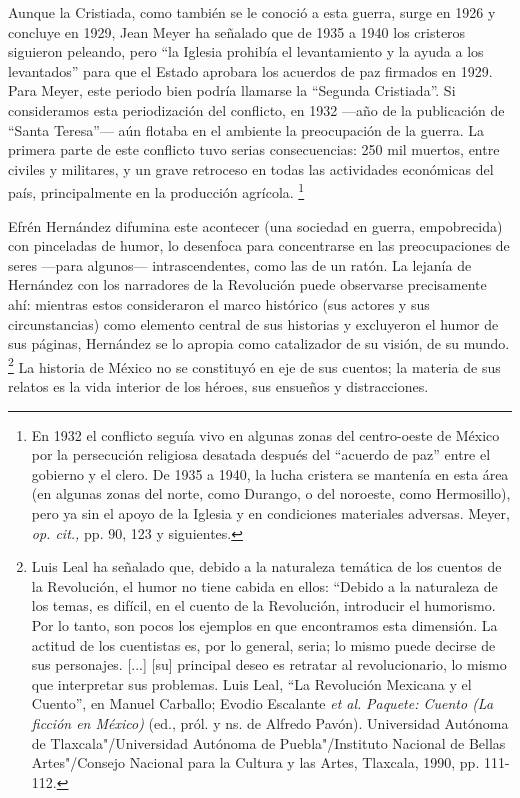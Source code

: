 \documentclass[14pt,twoside,final]{extbook} %
\let\oldfootnote\footnote
\renewcommand\footnote[1]{%
\oldfootnote{\hspace{1mm}#1}}
\begin{document}
Aunque la Cristiada, como también se le conoció a esta guerra, surge en 1926 y concluye en 1929, Jean Meyer ha señalado que de 1935 a 1940 los cristeros siguieron peleando, pero ``la Iglesia prohibía el levantamiento y la ayuda a los levantados'' para que el Estado aprobara los acuerdos de paz firmados en 1929. Para Meyer, este periodo bien podría llamarse la ``Segunda Cristiada''. Si consideramos esta
periodización del conflicto, en 1932 ---año de la publicación de ``Santa Teresa''--- aún flotaba en el ambiente la preocupación de la guerra. La primera parte de este conflicto tuvo serias consecuencias: 250 mil muertos, entre civiles y militares, y un grave retroceso en todas las actividades económicas del país, principalmente en la producción agrícola.\footnote{En 1932 el conflicto seguía vivo en algunas zonas del centro-oeste de México por la persecución religiosa desatada después del ``acuerdo de paz'' entre el gobierno y el clero. De 1935 a 1940, la lucha cristera se mantenía en esta área (en algunas zonas del norte, como Durango, o del noroeste, como Hermosillo), pero ya sin el apoyo de la Iglesia y en condiciones materiales adversas. Meyer, \emph{op. cit.,} pp. 90, 123 y siguientes.}

Efrén Hernández difumina este acontecer (una sociedad en guerra, empobrecida) con pinceladas de humor, lo desenfoca para concentrarse en las preocupaciones de seres ---para algunos--- intrascendentes, como las de un ratón. La lejanía de Hernández con los narradores de la Revolución puede observarse precisamente ahí: mientras estos consideraron el marco histórico (sus actores y sus circunstancias) como elemento central de sus historias y excluyeron el humor de sus páginas, Hernández se lo apropia como catalizador de su visión, de su mundo.\footnote{Luis Leal ha señalado que, debido a la naturaleza temática de los cuentos de la Revolución, el humor no tiene cabida en ellos: ``Debido a la naturaleza de los temas, es difícil, en el cuento de la Revolución, introducir el humorismo. Por lo tanto, son pocos los ejemplos en que encontramos esta dimensión. La actitud de los cuentistas es, por lo general, seria; lo mismo puede decirse de sus personajes. [...] [su] principal deseo es retratar al revolucionario, lo mismo que interpretar sus problemas. Luis Leal, ``La Revolución Mexicana y el Cuento'', en Manuel Carballo; Evodio Escalante \emph{et al.} \emph{Paquete: Cuento (La ficción en México)} (ed., pról. y ns. de Alfredo Pavón). Universidad Autónoma de Tlaxcala"/Universidad Autónoma de Puebla"/Instituto Nacional de Bellas Artes"/Consejo Nacional para la Cultura y las Artes, Tlaxcala, 1990, pp. 111-112.} La historia de México no se constituyó en eje de sus cuentos; la materia de sus relatos es la vida interior de los héroes, sus ensueños y distracciones.
\end{document}

